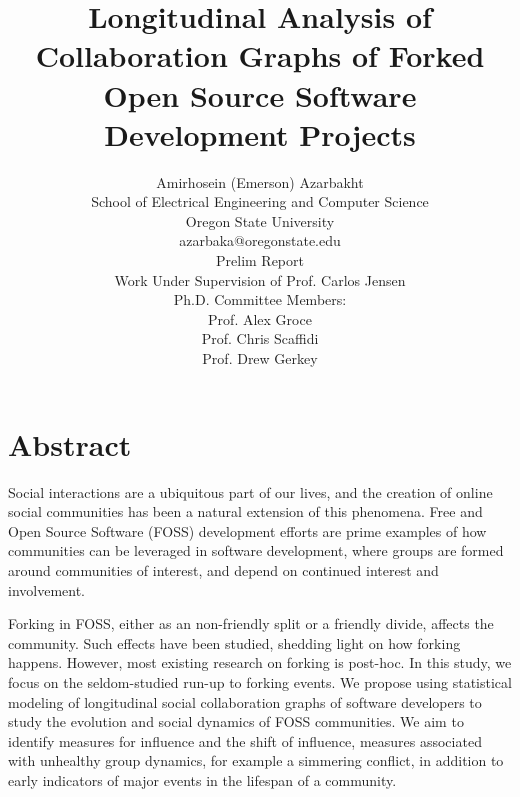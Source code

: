 \documentclass[11pt]{report}
\begin{document}
\title{Longitudinal Analysis of Collaboration Graphs of Forked Open Source Software Development Projects}

\author{Amirhosein (Emerson) Azarbakht\\
School of Electrical Engineering and Computer Science\\
Oregon State University\\
\vspace{5mm} %
azarbaka@oregonstate.edu\\
\vspace{5mm} %
Prelim Report\\
Work Under Supervision of Prof. Carlos Jensen\\
Ph.D. Committee Members:\\
Prof. Alex Groce\\
Prof. Chris Scaffidi\\
Prof. Drew Gerkey\\
}

\maketitle

\tableofcontents

\thispagestyle{empty}
\listoffigures
\listoftables

\pagebreak

\section{Abstract}

Social interactions are a ubiquitous part of our lives, and the creation of online social communities has been a natural extension of this phenomena. Free and Open Source Software (FOSS) development efforts are prime examples of how communities can be leveraged in software development, where groups are formed around communities of interest, and depend on continued interest and involvement. 

Forking in FOSS, either as an non-friendly split or a friendly divide, affects the community. Such effects have been studied, shedding light on how forking happens. However, most existing research on forking is post-hoc. In this study, we focus on the seldom-studied run-up to forking events. We propose using statistical modeling of longitudinal social collaboration graphs of software developers to study the evolution and social dynamics of FOSS communities. We aim to identify measures for influence and the shift of influence, measures associated with unhealthy group dynamics, for example a simmering conflict, in addition to early indicators of major events in the lifespan of a community. 
\end{document}
